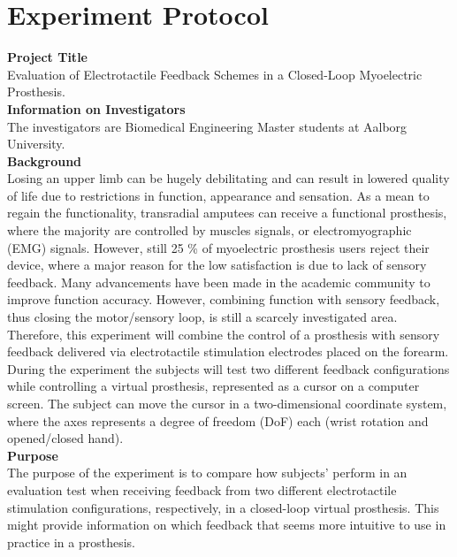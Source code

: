 \section{Experiment Protocol} \label{Ex_protocol}

\noindent \textbf{Project Title} \\
Evaluation of Electrotactile Feedback Schemes in a
Closed-Loop Myoelectric Prosthesis. 
\\

\noindent \textbf{Information on Investigators} \\
The investigators are Biomedical Engineering Master students at Aalborg University. 
\\

\noindent \textbf{Background} \\
Losing an upper limb can be hugely debilitating and can result in lowered quality of life due to restrictions in function, appearance and sensation. As a mean to regain the functionality, transradial amputees can receive a functional prosthesis, where the majority are controlled by muscles signals, or electromyographic (EMG) signals. However, still 25 \% of myoelectric prosthesis users reject their device, where a major reason for the low satisfaction is due to lack of sensory feedback.
Many advancements have been made in the academic community to improve function accuracy. However, combining function with sensory feedback, thus closing the motor/sensory loop, is still a scarcely investigated area. Therefore, this experiment will combine the control of a prosthesis with sensory feedback delivered via electrotactile stimulation electrodes placed on the forearm. During the experiment the subjects will test two different feedback configurations while controlling a virtual prosthesis, represented as a cursor on a computer screen. The subject can move the cursor in a two-dimensional coordinate system, where the axes represents a degree of freedom (DoF) each (wrist rotation and opened/closed hand).
\\

\noindent\textbf{Purpose} \\
The purpose of the experiment is to compare how subjects' perform in an evaluation test when receiving feedback from two different electrotactile stimulation configurations, respectively, in a closed-loop virtual prosthesis. This might provide information on which feedback that seems more intuitive to use in practice in a prosthesis.
\\

